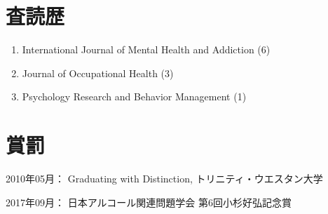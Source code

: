 \documentclass{article}
\begin{document}
\section{査読歴}
	\begin{enumerate}
	\item International Journal of Mental Health and Addiction (6)
	\item Journal of Occupational Health (3)
	\item Psychology Research and Behavior Management (1)
\end{enumerate}
\section{賞罰}
\begin{description}
	\item 2010年05月： Graduating with Distinction, トリニティ・ウエスタン大学
	\item 2017年09月： 日本アルコール関連問題学会 第6回小杉好弘記念賞
\end{description}
\end{document}
